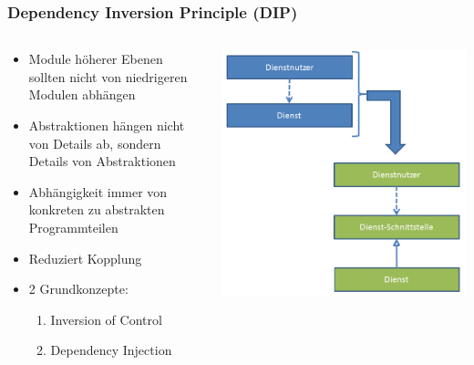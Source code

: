 \begin{frame}[fragile]
	\frametitle{Dependency Inversion Principle (DIP)}
	\begin{columns}
		\begin{column}{0.5\textwidth}
			\small
			\begin{itemize}
			  \item Module h\"oherer Ebenen sollten nicht von niedrigeren 
			  Modulen abh\"angen
			  \item Abstraktionen h\"angen nicht von Details ab, sondern
			  Details von Abstraktionen
			  \item Abh\"angigkeit immer von konkreten zu abstrakten Programmteilen
			  \item Reduziert Kopplung
			  \item 2 Grundkonzepte:
			  \begin{enumerate}
			    \item Inversion of Control
			    \item Dependency Injection
			  \end{enumerate}
			\end{itemize}
		\end{column}
		\begin{column}{0.5\textwidth}
			\center
	    	\includegraphics[width=1\textwidth,
	    	keepaspectratio=true]{bilder/dip.png}
		\end{column}
	\end{columns}
\end{frame}


